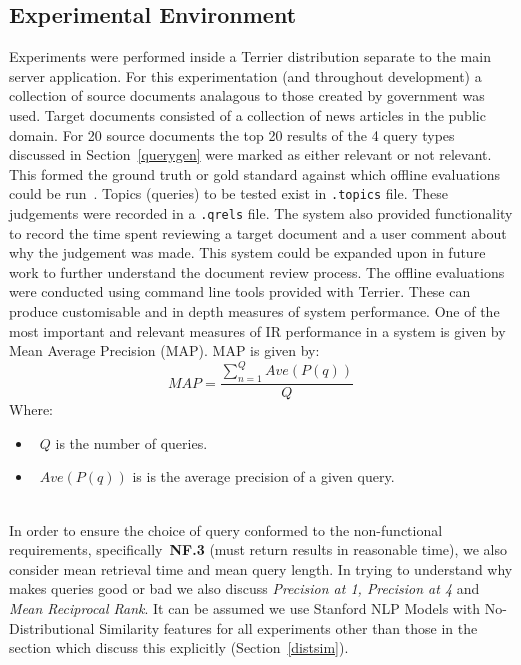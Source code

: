 \documentclass{l4proj}
\newcommand{\code}[1]{\texttt{#1}}
\begin{document}
\subsection{Experimental Environment}
Experiments were performed inside a Terrier distribution separate to the main server application. For this experimentation (and throughout development) a collection of source documents analagous to those created by government was used. Target documents consisted of a collection of news articles in the public domain.
For 20 source documents the top 20 results of the 4 query types discussed in Section~\ref{querygen} were marked as either relevant or not relevant. This formed the ground truth or gold standard against which offline evaluations could be run~\cite{Manning:2008:IIR:1394399}. Topics (queries) to be tested exist in \code{.topics} file. These judgements were recorded in a \code{.qrels} file. The system also provided functionality to record the time spent reviewing a target document and a user comment about why the judgement was made. This system could be expanded upon in future work to further understand the document review process.
The offline evaluations were conducted using command line tools provided with Terrier. These can produce customisable and in depth measures of system performance.
One of the most important and relevant measures of IR performance in a system is given by Mean Average Precision (MAP).
MAP is given by:
\begin{displaymath}
  MAP=\frac{\sum_{n=1}^{Q} Ave(P(q))}{Q}
\end{displaymath}
Where: 
\begin{itemize}
\item{~$Q$ is the number of queries.}
\item{~$Ave(P(q))$ is is the average precision of a given query.}
\end{itemize}
\hfill \cite{Manning:2008:IIR:1394399}\\
In order to ensure the choice of query conformed to the non-functional requirements, specifically~\textbf{NF.3} (must return results in reasonable time), we also consider mean retrieval time and mean query length.
 In trying to understand why makes queries good or bad we also discuss \textit{Precision at 1, Precision at 4} and \textit{Mean Reciprocal Rank}.
It can be assumed we use Stanford NLP Models with No-Distributional Similarity features for all experiments other than those in the section which discuss this explicitly (Section~\ref{distsim}).
\end{document}
